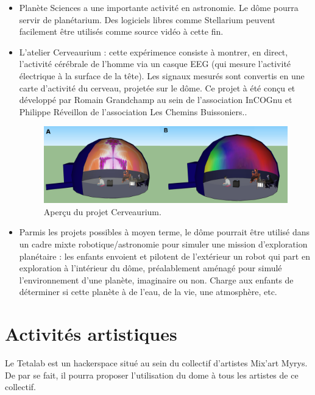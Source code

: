 \documentclass[a4paper,12pt]{report}
\begin{document}
\begin{itemize}
	\item Planète Sciences a une importante activité en astronomie. Le dôme
	pourra servir de planétarium. Des logiciels libres comme Stellarium peuvent
	facilement être utilisés comme source vidéo à cette fin.

	\item L'atelier Cerveaurium : cette expérimence consiste à montrer, en
	direct, l'activité cérébrale de l'homme via un casque EEG (qui mesure
	l'activité électrique à la surface de la tête). Les signaux mesurés sont
	convertis en une carte d'activité du cerveau, projetée sur le dôme. Ce
	projet à été conçu et développé par Romain Grandchamp au sein de
	l'association InCOGnu et Philippe Réveillon de l'association Les Chemins
	Buissoniers..

    \begin{figure}[!h]
    \centering
    \includegraphics[width=12cm]{cerveaurium.png}
	\caption{Aperçu du projet Cerveaurium.}
    \end{figure}


	\item Parmis les projets possibles à moyen terme, le dôme pourrait être
	utilisé dans un cadre mixte robotique/astronomie pour simuler une mission
	d'exploration planétaire : les enfants envoient et pilotent de l'extérieur
	un robot qui part en exploration à l'intérieur du dôme, préalablement
	aménagé pour simulé l'environnement d'une planète, imaginaire ou non.
	Charge aux enfants de déterminer si cette planète à de l'eau, de la vie,
	une atmosphère, etc.

\end{itemize}

\section{Activités artistiques}

Le Tetalab est un hackerspace situé au sein du collectif d'artistes Mix'art Myrys.
De par se fait, il pourra proposer l'utilisation du dome à tous les artistes de ce 
collectif.
\end{document}
